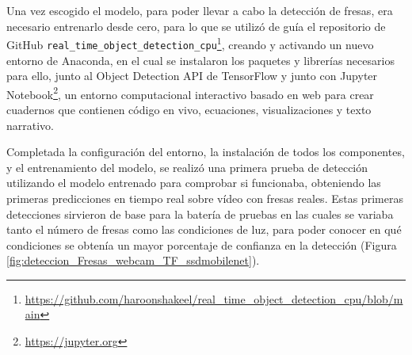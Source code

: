 Una vez escogido el modelo, para poder llevar a cabo la detección de fresas, era necesario entrenarlo desde cero, para lo que se utilizó de guía el repositorio de GitHub \verb|real_time_object_detection_cpu|\footnote{\url{https://github.com/haroonshakeel/real_time_object_detection_cpu/blob/main}}, creando y activando un nuevo entorno de Anaconda, en el cual se instalaron los paquetes y librerías necesarios para ello, junto al Object Detection API de TensorFlow y junto con Jupyter Notebook\footnote{\url{https://jupyter.org}}, un entorno computacional interactivo basado en web para crear cuadernos que contienen código en vivo, ecuaciones, visualizaciones y texto narrativo. 

\pagebreak
Completada la configuración del entorno, la instalación de todos los componentes, y el entrenamiento del modelo, se realizó una primera prueba de detección utilizando el modelo entrenado para comprobar si funcionaba, obteniendo las primeras predicciones en tiempo real sobre vídeo con fresas reales. Estas primeras detecciones sirvieron de base para la batería de pruebas en las cuales se variaba tanto el número de fresas como las condiciones de luz, para poder conocer en qué condiciones se obtenía un mayor porcentaje de confianza en la detección (Figura \ref{fig:deteccion_Fresas_webcam_TF_ssdmobilenet}).

